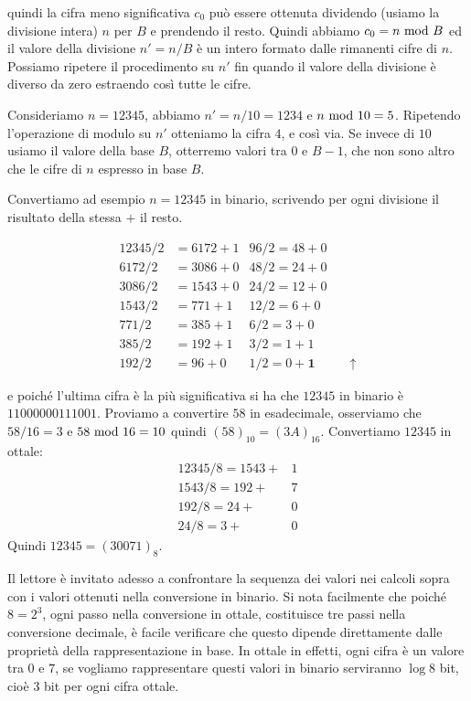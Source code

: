 \noindent quindi la cifra meno significativa $c_0$ può essere ottenuta
dividendo (usiamo la divisione intera) $n$ per $B$ e prendendo il resto.
 Quindi abbiamo $c_0 = n \ \text{mod}\ B$ ed il valore della divisione $n' = n /
B$ è un intero formato dalle rimanenti cifre di $n$. Possiamo ripetere il
procedimento su $n'$ fin quando il valore della divisione è diverso da zero estraendo così tutte le cifre.

\begin{ex}
Consideriamo $n = 12345$, abbiamo $n' = n/10 = 1234$ e $n \ \text{mod}\ 10 = 5$. Ripetendo l'operazione di modulo su $n'$ otteniamo la cifra $4$, e così via. Se
invece di $10$ usiamo il valore della base $B$, otterremo valori tra $0$ e $B-1$, che non sono altro che le cifre di $n$ espresso in base $B$.

Convertiamo ad esempio $n = 12345$ in binario, scrivendo per ogni divisione il risultato della stessa $+$ il resto.

\begin{align*}
 12345 / 2 &= 6172 + 1   &96 / 2 = 48 + 0\\
 6172  / 2 &= 3086 + 0   &48 / 2 = 24 + 0\\
 3086  / 2 &= 1543 + 0   &24 / 2 = 12 + 0\\
 1543  / 2 &= 771 + 1    &12 / 2 = 6 + 0\\
 771   / 2 &= 385 + 1    &6 / 2  = 3 + 0\\
 385   / 2 &= 192 + 1    &3 / 2  = 1 + 1\\
 192   / 2 &= 96 + 0     &1 / 2  = 0 + \mathbf{1}& \quad \uparrow
\end{align*}

\noindent e poiché l'ultima cifra è la più significativa si ha che $12345$ in binario è $11000000111001$. Proviamo a convertire $58$ in esadecimale, osserviamo che $58/16 = 3$ e $58 \ \text{mod}\ 16 = 10$ quindi $(58)_{10} = (3A)_{16}$. Convertiamo $12345$ in ottale:
\begin{align*}
 12345 / 8 = 1543 + &1 \\
 1543  / 8 = 192 + &7   \\
 192  / 8  = 24 + &0 \\
 24  / 8   = 3 + &0
\end{align*}
\noindent Quindi $12345 = (30071)_8$.
\end{ex}

Il lettore è invitato adesso a confrontare la sequenza dei valori nei calcoli sopra con i valori ottenuti nella conversione in binario. Si nota facilmente che poiché $8 = 2^3$, ogni passo nella conversione in ottale, costituisce tre passi nella conversione decimale, è facile verificare che questo dipende direttamente dalle proprietà della rappresentazione in base. In ottale in effetti, ogni cifra è un valore tra $0$ e $7$, se vogliamo rappresentare questi valori in binario serviranno $\log 8$ bit, cioè $3$ bit per ogni cifra ottale.

